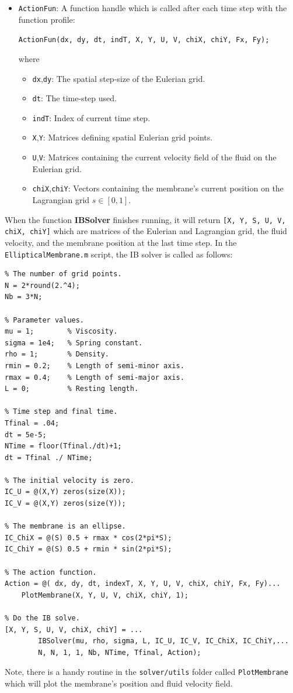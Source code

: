 \documentclass{article}
\newcommand{\mycode}[1]{\texttt{#1}}
\begin{document}
\begin{itemize}
\item \mycode{ActionFun}: A function handle which is called after each time step with the function profile:
							\begin{center}\mycode{ActionFun(dx, dy, dt, indT, X, Y, U, V, chiX, chiY, Fx, Fy);}\end{center}
							where 
							\begin{itemize}
								\item \mycode{dx},\mycode{dy}: The spatial step-size of the Eulerian grid.
								\item \mycode{dt}: The time-step used.
								\item \mycode{indT}: Index of current time step.
								\item \mycode{X},\mycode{Y}: Matrices defining spatial Eulerian grid points.
								\item \mycode{U},\mycode{V}: Matrices containing the current velocity field of the fluid on the Eulerian grid. 
								\item \mycode{chiX},\mycode{chiY}: Vectors containing the membrane's current position on the Lagrangian grid $s\in[0,1]$.
							\end{itemize}
\end{itemize}
When the function {\bf IBSolver} finishes running, it will return \mycode{[X, Y, S, U, V, chiX, chiY]} which are matrices of the Eulerian and Lagrangian grid,
the fluid velocity, and the membrane position at the last time step.
\newpage
In the \mycode{EllipticalMembrane.m} script, the IB solver is called as follows:
\begin{lstlisting}
% The number of grid points.
N = 2*round(2.^4); 
Nb = 3*N;

% Parameter values.
mu = 1;        % Viscosity.
sigma = 1e4;   % Spring constant.
rho = 1;       % Density.
rmin = 0.2;    % Length of semi-minor axis.
rmax = 0.4;    % Length of semi-major axis.
L = 0;         % Resting length.

% Time step and final time.
Tfinal = .04;
dt = 5e-5;
NTime = floor(Tfinal./dt)+1;
dt = Tfinal ./ NTime;

% The initial velocity is zero.
IC_U = @(X,Y) zeros(size(X));
IC_V = @(X,Y) zeros(size(Y));

% The membrane is an ellipse.
IC_ChiX = @(S) 0.5 + rmax * cos(2*pi*S);
IC_ChiY = @(S) 0.5 + rmin * sin(2*pi*S);

% The action function.
Action = @( dx, dy, dt, indexT, X, Y, U, V, chiX, chiY, Fx, Fy)...
    PlotMembrane(X, Y, U, V, chiX, chiY, 1);

% Do the IB solve.
[X, Y, S, U, V, chiX, chiY] = ...
        IBSolver(mu, rho, sigma, L, IC_U, IC_V, IC_ChiX, IC_ChiY,...
        N, N, 1, 1, Nb, NTime, Tfinal, Action);
\end{lstlisting}
Note, there is a handy routine in the \mycode{solver/utils} folder called \mycode{PlotMembrane} 
which will plot the membrane's position and fluid velocity field.
\end{document}
